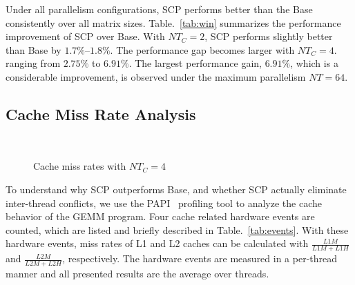 Under all parallelism configurations, 
SCP performs better than the Base
consistently over all matrix sizes.
Table.~\ref{tab:win} summarizes the performance improvement of SCP over Base.
With $NT_C=2$, SCP performs slightly better than Base
by $1.7\%$--$1.8\%$.
The performance gap becomes larger with $NT_C=4$.
ranging from $2.75\%$ to $6.91\%$.
The largest performance gain, $6.91\%$, which is a considerable improvement,
is observed under the maximum parallelism $NT=64$.



\subsection{Cache Miss Rate Analysis}\label{subsec:analysis}

\begin{figure}
  \centering
  \\
  \caption{Cache miss rates with $NT_C=4$}
  \label{fig:papi}
\end{figure}

To understand why SCP outperforms Base,
and whether SCP actually eliminate inter-thread conflicts,
we use the PAPI~\cite{papi} profiling tool to
analyze the cache behavior of the GEMM program.
Four cache related hardware events are counted,
which are listed and briefly described in Table.~\ref{tab:events}.
With these hardware events,
miss rates of L1 and L2 caches can be calculated with
$\frac{L1M}{L1M+L1H}$ and $\frac{L2M}{L2M+L2H}$, respectively.
The hardware events are measured in a per-thread manner
and all presented results are the average over threads.

